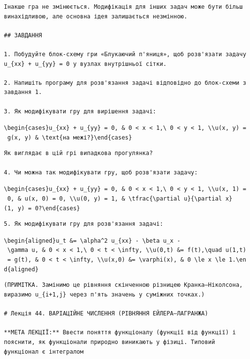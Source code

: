 \documentclass[
  ukrainian,
]{article}
\begin{document}
\begin{verbatim}
Інакше гра не змінюється. Модифікація для інших задач може бути більш винахідливою, але основна ідея залишається незмінною.

## ЗАВДАННЯ

1. Побудуйте блок-схему гри «Блукаючий п'яниця», щоб розв'язати задачу u_{xx} + u_{yy} = 0 у вузлах внутрішньої сітки.

2. Напишіть програму для розв'язання задачі відповідно до блок-схеми з завдання 1.

3. Як модифікувати гру для вирішення задачі:
\end{verbatim}

\texttt{\textbackslash{}begin\{cases\}u\_\{xx\}\ +\ u\_\{yy\}\ =\ 0,\ \&\ 0\ \textless{}\ x\ \textless{}\ 1,\textbackslash{}\ 0\ \textless{}\ y\ \textless{}\ 1,\ \textbackslash{}\textbackslash{}u(x,\ y)\ =\ g(x,\ y)\ \&\ \textbackslash{}text\{на\ межі?\}\textbackslash{}end\{cases\}}

\begin{verbatim}
Як виглядає в цій грі випадкова прогулянка?

4. Чи можна так модифікувати гру, щоб розв'язати задачу:
\end{verbatim}

\texttt{\textbackslash{}begin\{cases\}u\_\{xx\}\ +\ u\_\{yy\}\ =\ 0,\ \&\ 0\ \textless{}\ x\ \textless{}\ 1,\textbackslash{}\ 0\ \textless{}\ y\ \textless{}\ 1,\ \textbackslash{}\textbackslash{}u(x,\ 1)\ =\ 0,\ \&\ u(x,\ 0)\ =\ 0,\ \textbackslash{}\textbackslash{}u(0,\ y)\ =\ 1,\ \&\ \textbackslash{}tfrac\{\textbackslash{}partial\ u\}\{\textbackslash{}partial\ x\}(1,\ y)\ =\ 0?\textbackslash{}end\{cases\}}

\begin{verbatim}
5. Як модифікувати гру для розв'язання задачі:
\end{verbatim}

\texttt{\textbackslash{}begin\{aligned\}u\_t\ \&=\ \textbackslash{}alpha\^{}2\ u\_\{xx\}\ -\ \textbackslash{}beta\ u\_x\ -\ \textbackslash{}gamma\ u,\ \&\ 0\ \textless{}\ x\ \textless{}\ 1,\textbackslash{}\ 0\ \textless{}\ t\ \textless{}\ \textbackslash{}infty,\ \textbackslash{}\textbackslash{}u(0,t)\ \&=\ f(t),\textbackslash{}quad\ u(1,t)\ =\ g(t),\ \&\ 0\ \textless{}\ t\ \textless{}\ \textbackslash{}infty,\ \textbackslash{}\textbackslash{}u(x,0)\ \&=\ \textbackslash{}varphi(x),\ \&\ 0\ \textbackslash{}le\ x\ \textbackslash{}le\ 1.\textbackslash{}end\{aligned\}}

\begin{verbatim}
(ПРИМІТКА. Замінимо це рівняння скінченною різницею Кранка–Ніколсона, виразимо u_{i+1,j} через п'ять значень у суміжних точках.)

# Лекція 44. ВАРІАЦІЙНЕ ЧИСЛЕННЯ (РІВНЯННЯ ЕЙЛЕРА–ЛАГРАНЖА)

**МЕТА ЛЕКЦІЇ:** Ввести поняття функціоналу (функції від функції) і пояснити, як функціонали природно виникають у фізиці. Типовий функціонал є інтегралом
\end{verbatim}
\end{document}
